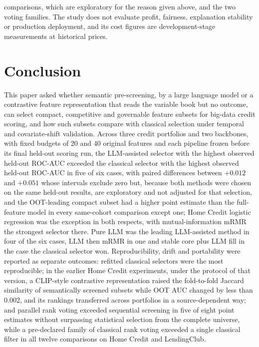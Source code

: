 \documentclass[final,5p,twocolumn]{elsarticle}
\begin{document}
comparisons, which are exploratory for the reason given above, and the two voting families. The study does not evaluate profit, fairness, explanation stability or production deployment, and its cost figures are development-stage measurements at historical prices.


\section{Conclusion}
\label{sec:conclusion}

This paper asked whether semantic pre-screening, by a large language model or a contrastive feature representation that reads the variable book but no outcome, can select compact, competitive and governable feature subsets for big-data credit scoring, and how such subsets compare with classical selection under temporal and covariate-shift validation. Across three credit portfolios and two backbones, with fixed budgets of 20 and 40 original features and each pipeline frozen before its final held-out scoring run, the LLM-assisted selector with the highest observed held-out ROC-AUC exceeded the classical selector with the highest observed held-out ROC-AUC in five of six cases, with paired differences between $+0.012$ and $+0.051$ whose intervals exclude zero but, because both methods were chosen on the same held-out results, are exploratory and not adjusted for that selection, and the OOT-leading compact subset had a higher point estimate than the full-feature model in every same-cohort comparison except one; Home Credit logistic regression was the exception in both respects, with mutual-information mRMR the strongest selector there. Pure LLM was the leading LLM-assisted method in four of the six cases, LLM then mRMR in one and stable core plus LLM fill in the case the classical selector won. Reproducibility, drift and portability were reported as separate outcomes: refitted classical selectors were the most reproducible; in the earlier Home Credit experiments, under the protocol of that version, a CLIP-style contrastive representation raised the fold-to-fold Jaccard similarity of semantically screened subsets while OOT AUC changed by less than 0.002, and its rankings transferred across portfolios in a source-dependent way; and parallel rank voting exceeded sequential screening in five of eight point estimates without surpassing statistical selection from the complete universe, while a pre-declared family of classical rank voting exceeded a single classical filter in all twelve comparisons on Home Credit and LendingClub.
\end{document}
